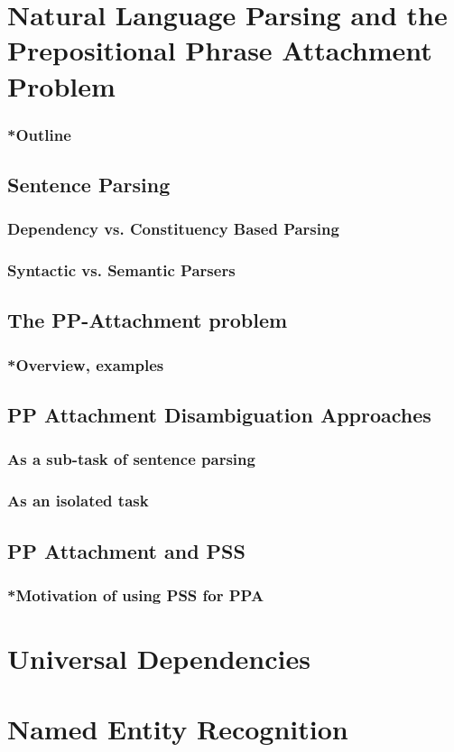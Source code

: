 \section{Natural Language Parsing and the Prepositional Phrase Attachment Problem}
\subsubsection{*Outline}
\subsection{Sentence Parsing}
\subsubsection{Dependency vs. Constituency Based Parsing}
\subsubsection{Syntactic vs. Semantic Parsers}
\subsection{The PP-Attachment problem}
\subsubsection{*Overview, examples}
\subsection{PP Attachment Disambiguation Approaches}
\subsubsection{As a sub-task of sentence parsing}
\subsubsection{As an isolated task}
\subsection{PP Attachment and PSS}
\subsubsection{*Motivation of using PSS for PPA}
\pagebreak


\section{Universal Dependencies}
\pagebreak

\section{Named Entity Recognition}
